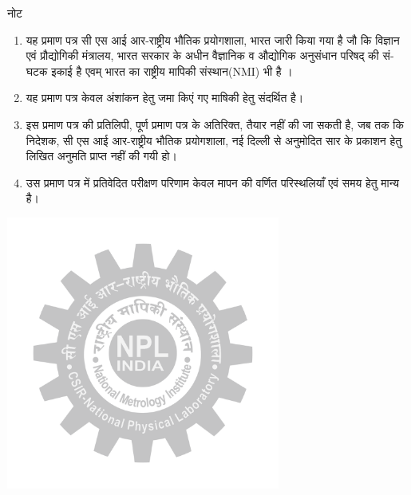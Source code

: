 \documentclass[a4paper]{article}
\begin{document}
\Large

\begin{center}\LARGE \texthindi{नोट}\end{center}
\begin{spacing}{0.8}
\begin{enumerate}
\item \texthindi{यह प्रमाण पत्र सी एस आई आर-राष्ट्रीय भौतिक प्रयोगशाला, भारत जारी किया गया है जौ कि विज्ञान एवं प्रौद्योगिकी मंत्रालय, भारत सरकार के अधीन वैज्ञानिक व औद्योगिक अनुसंधान परिषद्‌ की संघटक इकाई है एवम्‌ भारत का राष्ट्रीय मापिकी  संस्थान}(NMI) \texthindi{ भी है ।}

\item \texthindi{यह प्रमाण पत्र केवल अंशांकन हेतु जमा किएं गए माषिकी हेतु संदर्थित है।}

\item \texthindi{इस प्रमाण पत्र की प्रतिलिपी, पूर्ण प्रमाण पत्र के अतिरिक्त, तैयार नहीं की जा सकती है, जब तक कि निदेशक, सी एस आई आर-राष्ट्रीय भौतिक प्रयोगशाला, नई दिल्‍ली से अनुमोदित सार के प्रकाशन हेतु लिखित अनुमति प्राप्त नहीं की गयी हो।}

\item \texthindi{उस प्रमाण पत्र में प्रतिवेदित परीक्षण परिणाम केवल मापन की वर्णित परिस्थलियाँ एवं समय हेतु मान्य है।}
\end{enumerate}
\end{spacing}
\centering \includegraphics[width=9cm, height=9cm]{NPL_logo_gray.png}
\end{document}
